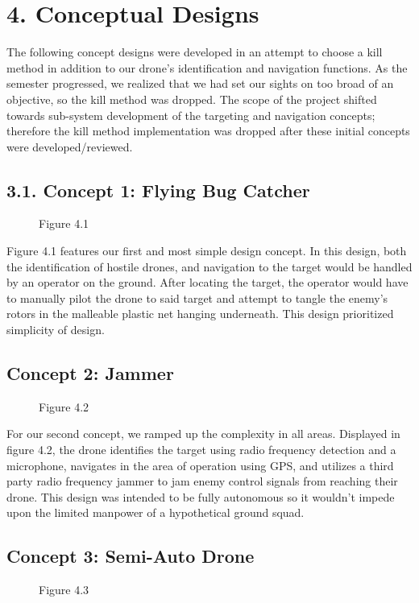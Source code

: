 \documentclass[10pt]{article}
\begin{document}
\section{4.  Conceptual Designs}
The following concept designs were developed in an attempt to choose a kill method in addition to our drone’s identification and navigation functions. As the semester progressed, we realized that we had set our sights on too broad of an objective, so the kill method was dropped. The scope of the project shifted towards sub-system development of the targeting and navigation concepts; therefore the kill method implementation was dropped after these initial concepts were developed/reviewed.

\subsection{3.1. Concept 1:  Flying Bug Catcher}
\begin{figure}
\caption{Figure 4.1}
\label{fig:4.1}
\end{figure}

	Figure 4.1 features our first and most simple design concept. In this design, both the identification of hostile drones, and navigation to the target would be handled by an operator on the ground. After locating the target, the operator would have to manually pilot the drone to said target and attempt to tangle the enemy’s rotors in the malleable plastic net hanging underneath. This design prioritized simplicity of design.

\subsection{Concept 2:  Jammer}
\begin{figure}
\caption{Figure 4.2}
\label{fig:4.2}
\end{figure}
For our second concept, we ramped up the complexity in all areas. Displayed in figure 4.2, the drone identifies the target using radio frequency detection and a microphone, navigates in the area of operation using GPS, and  utilizes a third party radio frequency jammer to jam enemy control signals from reaching their drone. This design was intended to be fully autonomous so it wouldn’t impede upon the limited manpower of a hypothetical ground squad.

\subsection{Concept 3:  Semi-Auto Drone}
\begin{figure}
\caption{Figure 4.3}
\label{fig:4.3}
\end{figure}
\end{document}
